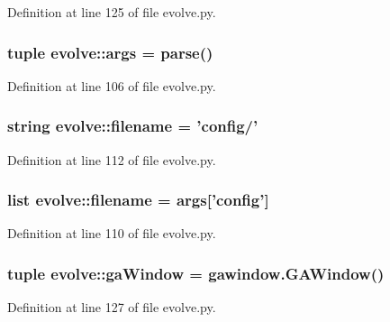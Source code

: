 Definition at line 125 of file evolve.py.
\subsubsection{\setlength{\rightskip}{0pt plus 5cm}tuple {\bf evolve::args} = parse()\hspace{0.3cm}{\tt  [static]}}\label{namespaceevolve_c22dce30c5211818dcb8c5221e2f7ea8}




Definition at line 106 of file evolve.py.
\subsubsection{\setlength{\rightskip}{0pt plus 5cm}string {\bf evolve::filename} = 'config/'\hspace{0.3cm}{\tt  [static]}}\label{namespaceevolve_3016bd4634d286d80af133a3d7c5a9d6}




Definition at line 112 of file evolve.py.
\subsubsection{\setlength{\rightskip}{0pt plus 5cm}list {\bf evolve::filename} = {\bf args}['config']\hspace{0.3cm}{\tt  [static]}}\label{namespaceevolve_72aaaaf61ac5b6f1cf56914917fc2c01}




Definition at line 110 of file evolve.py.
\subsubsection{\setlength{\rightskip}{0pt plus 5cm}tuple {\bf evolve::gaWindow} = gawindow.GAWindow()\hspace{0.3cm}{\tt  [static]}}\label{namespaceevolve_91cd2d2df8858b13a516e4dea5e067a5}




Definition at line 127 of file evolve.py.